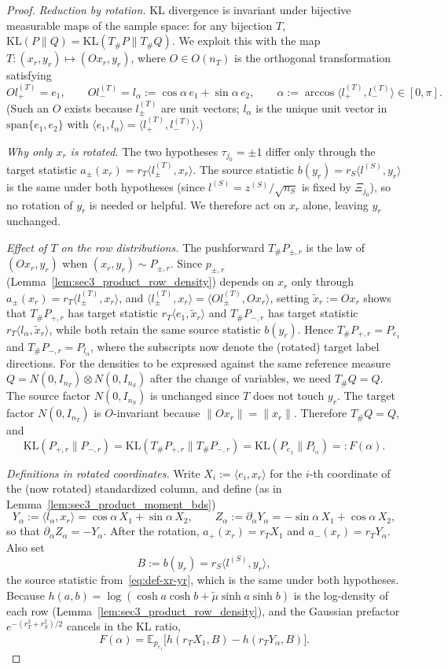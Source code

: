 \documentclass[10pt,a4paper]{amsart}
\newcommand{\Ebb}{\mathbb E}
\newcommand{\KL}{\mathrm{KL}}
\newcommand{\ip}[2]{\langle #1,#2\rangle}
\newcommand{\nS}{n_{\src}}
\newcommand{\nT}{n_{\trg}}
\newcommand{\src}{S}
\newcommand{\trg}{T}
\newcommand{\zsrc}{z^{(\src)}}
\begin{document}
\begin{proof}
\textit{Reduction by rotation.}
KL divergence is invariant under bijective measurable maps of the sample
space: for any bijection $T$, $\KL(P\|Q)=\KL(T_\#P\|T_\#Q)$.  We exploit
this with the map $T:(x_r,y_r)\mapsto(Ox_r,y_r)$, where $O\in O(\nT)$ is the
orthogonal transformation satisfying
\[
    Ol^{(\trg)}_+ = e_1, \qquad Ol^{(\trg)}_- = l_\alpha := \cos\alpha\,e_1+\sin\alpha\,e_2,
    \qquad \alpha := \arccos\!\ip{l^{(\trg)}_+}{l^{(\trg)}_-}\in[0,\pi].
\]
(Such an $O$ exists because $l^{(\trg)}_\pm$ are unit vectors; $l_\alpha$ is the
unique unit vector in $\mathrm{span}\{e_1,e_2\}$ with $\ip{e_1}{l_\alpha}=\ip{l^{(\trg)}_+}{l^{(\trg)}_-}$.)

\textit{Why only $x_r$ is rotated.}
The two hypotheses $\tau_{j_0}=\pm1$ differ only through the target statistic
$a_\pm(x_r)=r_T\ip{l^{(\trg)}_\pm}{x_r}$.
The source statistic $b(y_r)=r_S\ip{l^{(\src)}}{y_r}$ is the same under
both hypotheses (since $l^{(\src)}=\zsrc/\sqrt{\nS}$ is fixed by $\Xi_{j_0}$),
so no rotation of $y_r$ is needed or helpful.  We therefore act on
$x_r$ alone, leaving $y_r$ unchanged.

\textit{Effect of $T$ on the row distributions.}
The pushforward $T_\#P_{\pm,r}$ is the law of $(Ox_r,y_r)$ when
$(x_r,y_r)\sim P_{\pm,r}$.  Since $p_{\pm,r}$
(Lemma~\ref{lem:sec3_product_row_density}) depends on $x_r$ only through
$a_\pm(x_r)=r_T\ip{l^{(\trg)}_\pm}{x_r}$, and
$\ip{l^{(\trg)}_\pm}{x_r}=\ip{Ol^{(\trg)}_\pm}{Ox_r}$, setting
$\tilde x_r:=Ox_r$ shows that $T_\#P_{+,r}$ has target statistic
$r_T\ip{e_1}{\tilde x_r}$ and $T_\#P_{-,r}$ has target statistic
$r_T\ip{l_\alpha}{\tilde x_r}$, while both retain the same source statistic
$b(y_r)$.  Hence $T_\#P_{+,r}=P_{e_1}$ and $T_\#P_{-,r}=P_{l_\alpha}$,
where the subscripts now denote the (rotated) target label directions.
For the densities to be expressed against the same reference measure
$Q=N(0,I_{\nT})\otimes N(0,I_{\nS})$ after the change of variables, we
need $T_\#Q=Q$.  The source factor $N(0,I_{\nS})$ is unchanged since $T$
does not touch $y_r$.  The target factor $N(0,I_{\nT})$ is $O$-invariant
because $\|Ox_r\|=\|x_r\|$.  Therefore $T_\#Q=Q$, and
\[
    \KL(P_{+,r}\|P_{-,r})
    =
    \KL(T_\#P_{+,r}\|T_\#P_{-,r})
    =
    \KL(P_{e_1}\|P_{l_\alpha})
    =:
    F(\alpha).
\]

\textit{Definitions in rotated coordinates.}
Write $X_i:=\ip{e_i}{x_r}$ for the $i$-th coordinate of the (now rotated)
standardized column, and define (as in Lemma~\ref{lem:sec3_product_moment_bds})
\[
    Y_\alpha := \ip{l_\alpha}{x_r} = \cos\alpha\,X_1+\sin\alpha\,X_2,
    \qquad
    Z_\alpha := \partial_\alpha Y_\alpha = -\sin\alpha\,X_1+\cos\alpha\,X_2,
\]
so that $\partial_\alpha Z_\alpha=-Y_\alpha$.  After the rotation,
$a_+(x_r)=r_T X_1$ and $a_-(x_r)=r_T Y_\alpha$.  Also set
\[
    B := b(y_r) = r_S\ip{l^{(\src)}}{y_r},
\]
the source statistic from~\eqref{eq:def-xr-yr}, which is the same under
both hypotheses.  Because
$h(a,b)=\log(\cosh a\cosh b+\tilde\mu\sinh a\sinh b)$ is the log-density
of each row (Lemma~\ref{lem:sec3_product_row_density}), and the Gaussian
prefactor $e^{-(r_T^2+r_S^2)/2}$ cancels in the KL ratio,
\[
    F(\alpha)
    =
    \Ebb_{p_{e_1}}\!\bigl[h(r_T X_1,B)-h(r_T Y_\alpha,B)\bigr].
\]


\end{proof}
\end{document}
